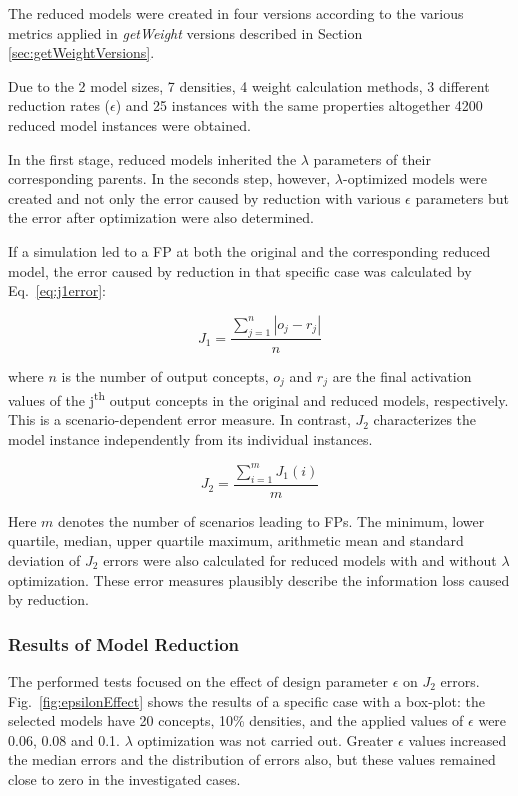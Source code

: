 \documentclass[graybox]{svmult}
\begin{document}
The reduced models were created in four versions according to the 
various metrics applied in \emph{getWeight} versions described 
in Section \ref{sec:getWeightVersions}. 

Due to the 2 model sizes, 7 densities, 4 weight calculation methods, 3 
different reduction rates ($\epsilon$) and 25 instances with the same 
properties altogether 4200 reduced model instances were obtained.

In the first stage, reduced models inherited the $\lambda$ parameters 
of their corresponding parents. In the seconds step, however, 
$\lambda$-optimized models were created and not only the error caused 
by reduction with various $\epsilon$ parameters but the error after 
optimization were also determined.

If a simulation led to a FP at both the original and 
the corresponding reduced model, the error caused by reduction in that 
specific case was calculated by Eq.~\ref{eq:j1error}:

\begin{equation}
  \label{eq:j1error}
  J_1 = \frac{\sum_{j=1}^{n} |o_j - r_j|}{n}
\end{equation}

\noindent where $n$ is the number of output concepts, $o_j$ and $r_j$ are the 
final activation values of the j\textsuperscript{th} output concepts in 
the original and reduced models, respectively. This is a 
scenario-dependent error measure. In contrast, $J_2$ characterizes the 
model instance independently from its individual instances.

\begin{equation}
  \label{eq:j2error}
  J_2 = \frac{\sum_{i=1}^{m} J_1(i)}{m}
\end{equation}

Here $m$ denotes the number of scenarios leading to FPs. The minimum, 
lower quartile, median, upper quartile maximum, arithmetic mean and 
standard deviation of $J_2$ errors were also calculated for reduced 
models with and without $\lambda$ optimization. These error measures 
plausibly describe the information loss caused by reduction.

\subsubsection{Results of Model Reduction}
\label{sec:results}

The performed tests focused on the effect of design parameter 
$\epsilon$ on $J_2$ errors. Fig.~\ref{fig:epsilonEffect} shows the 
results of a specific case with a box-plot: the selected models have 20 
concepts, 10\% densities, and the applied values of $\epsilon$ were 
0.06, 0.08 and 0.1. $\lambda$ optimization was not carried out. Greater 
$\epsilon$ values increased the median errors and the distribution of 
errors also, but these values remained close to zero in the 
investigated cases.
\end{document}
